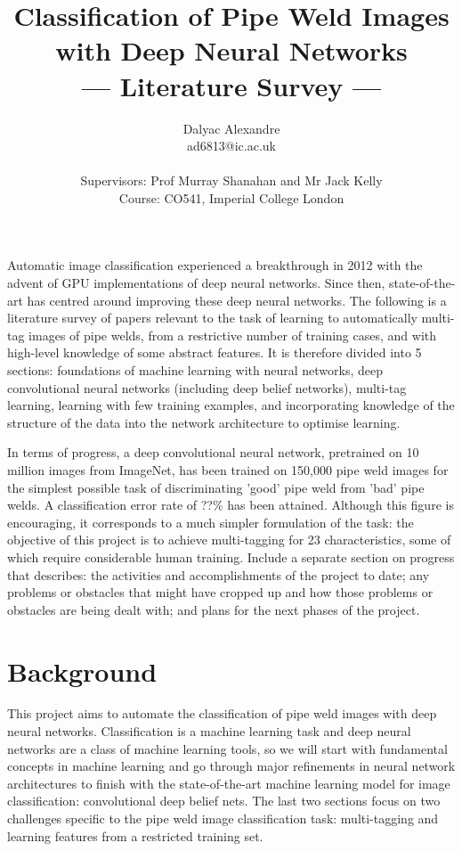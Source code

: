 \documentclass[a4paper,11pt]{article}
\title{Classification of Pipe Weld Images with Deep Neural Networks\\\Large{--- Literature Survey ---}}
\author{Dalyac Alexandre\\
       ad6813@ic.ac.uk\\ \\
       \small{Supervisors: Prof Murray Shanahan and Mr Jack Kelly}\\
       \small{Course: CO541, Imperial College London}
}
\begin{document}
\maketitle

\abstract
{
\par Automatic image classification experienced a breakthrough in 2012 with the advent of GPU implementations of deep neural networks. Since then, state-of-the-art has centred around improving these deep neural networks. The following is a literature survey of papers relevant to the task of learning to automatically multi-tag images of pipe welds, from a restrictive number of training cases, and with high-level knowledge of some abstract features. It is therefore divided into 5 sections: foundations of machine learning with neural networks, deep convolutional neural networks (including deep belief networks), multi-tag learning, learning with few training examples, and incorporating knowledge of the structure of the data into the network architecture to optimise learning.\\

\par In terms of progress, a deep convolutional neural network, pretrained on 10 million images from ImageNet, has been trained on 150,000 pipe weld images for the simplest possible task of discriminating 'good' pipe weld from 'bad' pipe welds. A classification error rate of ??\% has been attained. Although this figure is encouraging, it corresponds to a much simpler formulation of the task: the objective of this project is to achieve multi-tagging for 23 characteristics, some of which require considerable human training.  Include a separate section on progress that describes: the activities and accomplishments of the project to date; any problems or obstacles that might have cropped up and how those problems or obstacles are being dealt with; and plans for the next phases of the project.
}

\clearpage
\tableofcontents

\clearpage
\section{Background}

This project aims to automate the classification of pipe weld images with deep neural networks. Classification is a  machine learning task and deep neural networks are a class of machine learning tools, so we will start with fundamental concepts in machine learning and go through major refinements in neural network architectures to finish with the state-of-the-art machine learning model for image classification: convolutional deep belief nets. The last two sections focus on two challenges specific to the pipe weld image classification task: multi-tagging and learning features from a restricted training set.
\end{document}
